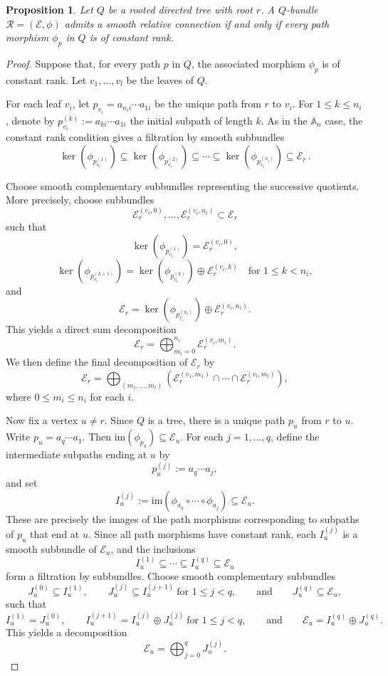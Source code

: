 \documentclass[12pt, reqno]{amsart}
\theoremstyle{plain}
\newtheorem{proposition}[theorem]{Proposition}
\numberwithin{equation}{section}
\newcommand{\im}{\mathrm{im}}
\begin{document}
\begin{proposition}\label{tree}
Let $Q$ be a rooted directed tree with root $r$. A $Q$-bundle $\mathcal{R} = (\mathcal{E}, \phi)$ admits a smooth relative connection if and only if every path morphism $\phi_p$ in $Q$ is of constant rank.
\end{proposition}
\begin{proof}
Suppose that, for every path $p$ in $Q$, the associated morphism $\phi_p$ is of constant rank. Let $v_1, \dots, v_l$ be the leaves of $Q$. 

For each leaf $v_i$, let $p_{v_i} = a_{n_i i} \cdots a_{1 i}$
be the unique path from $r$ to $v_i$. 
For $1 \le k \le n_i$, denote by
$p_{v_i}^{(k)} := a_{k i} \cdots  a_{1 i}$
the initial subpath of length $k$.
As in the $\mathbb{A}_n$ case, the constant rank condition gives a filtration by smooth subbundles
\[
\ker(\phi_{p_{v_i}^{(1)}})
\subseteq
\ker(\phi_{p_{v_i}^{(2)}})
\subseteq
\cdots
\subseteq
\ker(\phi_{p_{v_i}^{(n_i)}}) \subseteq
\mathcal{E}_r\,.
\]

Choose smooth complementary subbundles representing the successive quotients. 
More precisely, choose subbundles
\[
\mathcal{E}_r^{(v_i,0)}, \dots, \mathcal{E}_r^{(v_i,n_i)} \subset \mathcal{E}_r
\]
such that
\[
\ker(\phi_{p_{v_i}^{(1)}}) = \mathcal{E}_r^{(v_i,0)},
\]
\[
\ker(\phi_{p_{v_i}^{(k+1)}})
=
\ker(\phi_{p_{v_i}^{(k)}})
\oplus
\mathcal{E}_r^{(v_i,k)}
\quad \text{for } 1 \le k < n_i,
\]
and
\[
\mathcal{E}_r
=
\ker(\phi_{p_{v_i}^{(n_i)}})
\oplus
\mathcal{E}_r^{(v_i,n_i)}.
\]
This yields a direct sum decomposition
\[
\mathcal{E}_r
=
\bigoplus_{m_i=0}^{n_i}
\mathcal{E}_r^{(v_i,m_i)}.
\]
We then define the final decomposition of $\mathcal{E}_r$ by
\[
\mathcal{E}_r
=
\bigoplus_{(m_1,\dots,m_l)}
\left(
\mathcal{E}_r^{(v_1,m_1)}
\cap
\cdots
\cap
\mathcal{E}_r^{(v_l,m_l)}
\right),
\]
where $0 \le m_i \le n_i$ for each $i$.

Now fix a vertex $u \neq r$. Since $Q$ is a tree, there is a unique path $p_u$ from $r$ to $u$. Write
$p_u = a_q \cdots a_1.$
Then $\im(\phi_{p_u}) \subseteq \mathcal{E}_u$.
For each $j = 1, \dots, q$, define the intermediate subpaths ending at $u$ by
\[
p_u^{(j)} := a_q \cdots a_j,
\]
and set
\[
I_u^{(j)} := \im(\phi_{a_q} \circ \cdots \circ \phi_{a_j})
\subseteq \mathcal{E}_u.
\]
These are precisely the images of the path morphisms corresponding to subpaths of $p_u$ that end at $u$. Since all path morphisms have constant rank, each $I_u^{(j)}$ is a smooth subbundle of $\mathcal{E}_u$, and the inclusions
\[
I_u^{(1)} \subseteq \cdots \subseteq I_u^{(q)} \subseteq \mathcal{E}_u
\]
form a filtration by subbundles. Choose smooth complementary subbundles
\[
J_u^{(0)} \subseteq I_u^{(1)}, \qquad
J_u^{(j)} \subseteq I_u^{(j+1)} \ \text{for } 1 \le j < q, \qquad \text{and} \qquad J_u^{(q)} \subseteq \mathcal{E}_u,
\]
such that
\[
I_u^{(1)} = J_u^{(0)}, \qquad
I_u^{(j+1)} = I_u^{(j)} \oplus J_u^{(j)} \ \text{for } 1 \le j < q, \qquad \text{and} \qquad
\mathcal{E}_u = I_u^{(q)} \oplus J_u^{(q)}.
\]
This yields a decomposition
\[
\mathcal{E}_u
=
\bigoplus_{j=0}^{q}
J_u^{(j)}.
\]



\end{proof}
\end{document}
